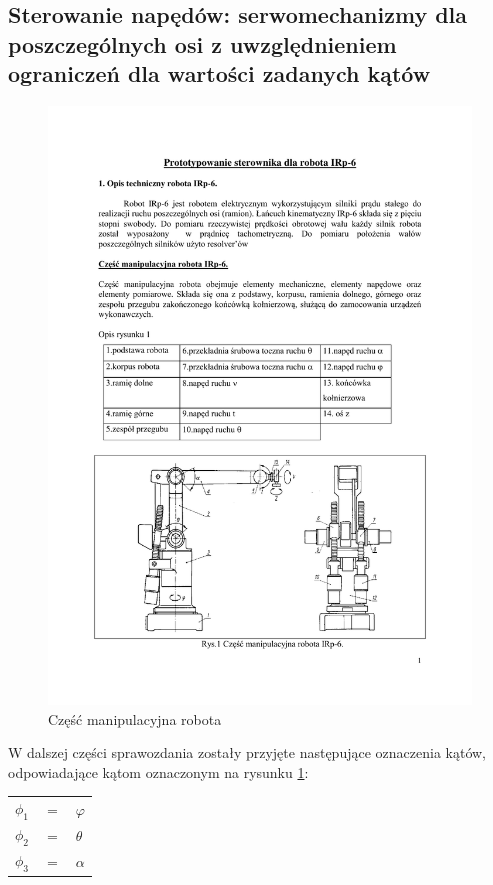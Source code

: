 \documentclass[12pt]{article}
\begin{document}
\subsection{Sterowanie napędów: serwomechanizmy dla poszczególnych osi z
uwzględnieniem ograniczeń dla wartości zadanych kątów}

\begin{figure}[!htb]
    \begin{center}
        \includegraphics[page=1,width=17cm,trim=2.5cm 3.5cm 3cm 17.5cm,clip]
        {../res/img/ster_irp.pdf}
    \end{center}
    \caption{Część manipulacyjna robota}\label{rys:manip}
\end{figure}

W dalszej części sprawozdania zostały przyjęte następujące oznaczenia kątów,
odpowiadające kątom oznaczonym na rysunku \ref{rys:manip}:
\begin{center} 
    \begin{tabular}{lll}
        $\phi_1$ & $=$ & $\varphi$\\[0.1cm]
        $\phi_2$ & $=$ & $\theta$\\[0.1cm]
        $\phi_3$ & $=$ & $\alpha$
    \end{tabular}\\[0.1cm]
\end{center}
\end{document}
